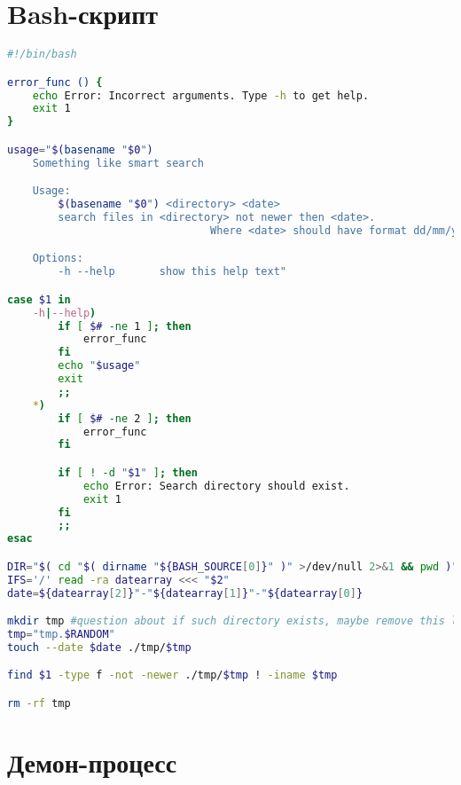 \documentclass{article}
\begin{document}
	\newpage
	\section{Bash-скрипт}

	\begin{lstlisting}[language = bash, style=style, title={Скрипт на языке bash}]
#!/bin/bash

error_func () {
    echo Error: Incorrect arguments. Type -h to get help.
    exit 1
}

usage="$(basename "$0")
    Something like smart search

    Usage:
		$(basename "$0") <directory> <date>
		search files in <directory> not newer then <date>.
                                Where <date> should have format dd/mm/yyyy.

    Options:
        -h --help       show this help text"

case $1 in
    -h|--help)
        if [ $# -ne 1 ]; then
            error_func
        fi
        echo "$usage"
        exit
        ;;
    *)
        if [ $# -ne 2 ]; then
            error_func
        fi

        if [ ! -d "$1" ]; then
            echo Error: Search directory should exist.
            exit 1
        fi
        ;;
esac

DIR="$( cd "$( dirname "${BASH_SOURCE[0]}" )" >/dev/null 2>&1 && pwd )"
IFS='/' read -ra datearray <<< "$2"
date=${datearray[2]}"-"${datearray[1]}"-"${datearray[0]}

mkdir tmp #question about if such directory exists, maybe remove this line?
tmp="tmp.$RANDOM"
touch --date $date ./tmp/$tmp

find $1 -type f -not -newer ./tmp/$tmp ! -iname $tmp

rm -rf tmp
	\end{lstlisting}

	\newpage
	\section{Демон-процесс}
\end{document}
